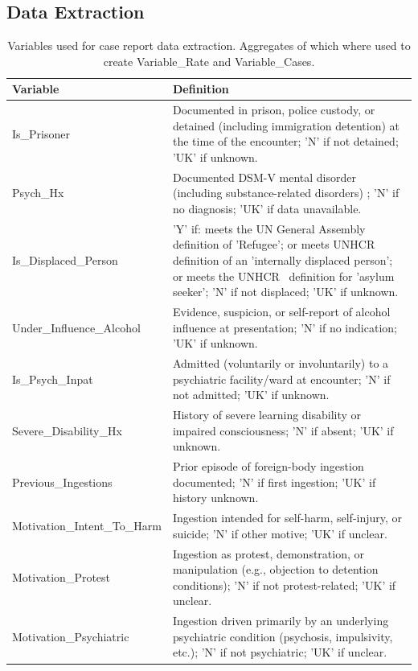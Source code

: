\begin{appendices}
\subsection{Data Extraction}
\label{appendix:data_extraction}

\begin{table}[h]
\caption{Variables used for case report data extraction. Aggregates of which where used to create Variable\_Rate and Variable\_Cases.}
\label{tab:variables_table}
\centering
\begin{tabular}{p{4cm} p{11cm}}
\toprule
\textbf{Variable} & \textbf{Definition} \\
\midrule
Is\_Prisoner & Documented in prison, police custody, or detained (including immigration detention) at the time of the encounter; 'N' if not detained; 'UK' if unknown. \\
Psych\_Hx & Documented DSM-V mental disorder (including substance-related disorders) \cite{AmericanPsychiatricAssociation_2013}; 'N' if no diagnosis; 'UK' if data unavailable. \\
Is\_Displaced\_Person & 'Y' if: meets the UN General Assembly \cite{UNGeneralAssembly_1967} definition of 'Refugee'; or meets UNHCR~\cite{Deng_1998} definition of an 'internally displaced person'; or meets the UNHCR~\cite{UnitedNationsHighCommissionerforRefugees_2025} definition for 'asylum seeker'; 'N' if not displaced; 'UK' if unknown. \\
Under\_Influence\_Alcohol & Evidence, suspicion, or self-report of alcohol influence at presentation; 'N' if no indication; 'UK' if unknown. \\
Is\_Psych\_Inpat & Admitted (voluntarily or involuntarily) to a psychiatric facility/ward at encounter; 'N' if not admitted; 'UK' if unknown. \\
Severe\_Disability\_Hx & History of severe learning disability or impaired consciousness; 'N' if absent; 'UK' if unknown. \\
Previous\_Ingestions & Prior episode of foreign-body ingestion documented; 'N' if first ingestion; 'UK' if history unknown. \\
Motivation\_Intent\_To\_Harm & Ingestion intended for self-harm, self-injury, or suicide; 'N' if other motive; 'UK' if unclear. \\
Motivation\_Protest & Ingestion as protest, demonstration, or manipulation (e.g., objection to detention conditions); 'N' if not protest-related; 'UK' if unclear. \\
Motivation\_Psychiatric & Ingestion driven primarily by an underlying psychiatric condition (psychosis, impulsivity, etc.); 'N' if not psychiatric; 'UK' if unclear. \\

\end{tabular}
\end{table}
\end{appendices}
